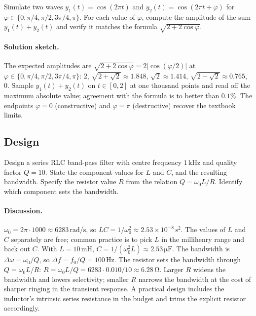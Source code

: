 \begin{exercise}
Simulate two waves $y_{1}(t) = \cos(2\pi t)$ and $y_{2}(t) =
\cos(2\pi t + \varphi)$ for $\varphi \in \{0, \pi/4, \pi/2,
3\pi/4, \pi\}$. For each value of $\varphi$, compute the
amplitude of the sum $y_{1}(t) + y_{2}(t)$ and verify it matches
the formula $\sqrt{2 + 2\cos\varphi}$.

\paragraph{Solution sketch.}
The expected amplitudes are $\sqrt{2 + 2\cos\varphi} = 2|\cos
(\varphi/2)|$ at $\varphi \in \{0, \pi/4, \pi/2, 3\pi/4, \pi\}$:
$2$, $\sqrt{2 + \sqrt{2}} \approx 1.848$, $\sqrt{2} \approx 1.414$,
$\sqrt{2 - \sqrt{2}} \approx 0.765$, $0$. Sample $y_{1}(t) +
y_{2}(t)$ on $t \in [0, 2]$ at one thousand points and read off
the maximum absolute value; agreement with the formula is to
better than $0.1\%$. The endpoints $\varphi = 0$ (constructive)
and $\varphi = \pi$ (destructive) recover the textbook limits.
\end{exercise}

\subsection*{Design}

\begin{exercise}
Design a series RLC band-pass filter with centre frequency $1
\,\si{\kilo\hertz}$ and quality factor $Q = 10$. State the
component values for $L$ and $C$, and the resulting bandwidth.
Specify the resistor value $R$ from the relation $Q = \omega_{0}
L / R$. Identify which component sets the bandwidth.

\paragraph{Discussion.}
$\omega_{0} = 2\pi \cdot 1000 \approx 6283\,\si{\radian\per\second}$,
so $LC = 1/\omega_{0}^{2} \approx 2.53 \times 10^{-8}\,\si{\second
\squared}$. The values of $L$ and $C$ separately are free; common
practice is to pick $L$ in the millihenry range and back out $C$.
With $L = 10\,\si{\milli\henry}$, $C = 1/(\omega_{0}^{2} L) \approx
2.53\,\si{\micro\farad}$. The bandwidth is
$\Delta\omega = \omega_{0}/Q$, so $\Delta f = f_{0}/Q = 100\,\si
{\hertz}$. The resistor sets the bandwidth through $Q = \omega_{0}
L / R$: $R = \omega_{0} L / Q = 6283 \cdot 0.010 / 10 \approx
6.28\,\si{\ohm}$. Larger $R$ widens the bandwidth and lowers
selectivity; smaller $R$ narrows the bandwidth at the cost of
sharper ringing in the transient response. A practical design
includes the inductor's intrinsic series resistance in the
budget and trims the explicit resistor accordingly.
\end{exercise}

